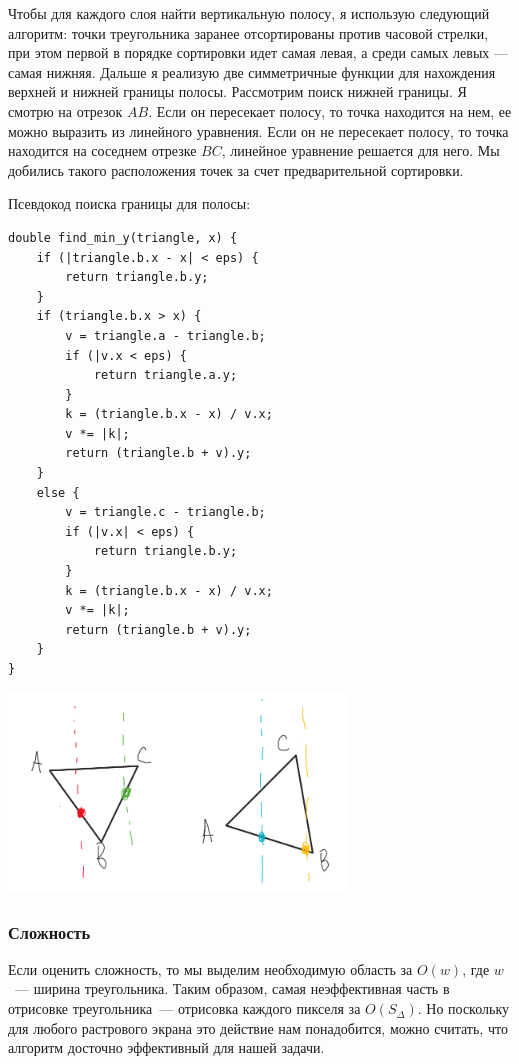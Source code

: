 \documentclass{article}
\begin{document}
Чтобы для каждого слоя найти вертикальную полосу, я использую следующий алгоритм: точки треугольника заранее отсортированы против часовой стрелки, при этом первой в порядке сортировки идет самая левая, а среди самых левых --- самая нижняя. Дальше я реализую две симметричные функции для нахождения верхней и нижней границы полосы. Рассмотрим поиск нижней границы. Я смотрю на отрезок $AB$. Если он пересекает полосу, то точка находится на нем, ее можно выразить из линейного уравнения. Если он не пересекает полосу, то точка находится на соседнем отрезке $BC$, линейное уравнение решается для него. Мы добились такого расположения точек за счет предварительной сортировки.

Псевдокод поиска границы для полосы:

\begin{verbatim}
double find_min_y(triangle, x) {
    if (|triangle.b.x - x| < eps) {
        return triangle.b.y;
    }
    if (triangle.b.x > x) {
        v = triangle.a - triangle.b;
        if (|v.x < eps) {
            return triangle.a.y;   
        }
        k = (triangle.b.x - x) / v.x;
        v *= |k|;
        return (triangle.b + v).y;
    }
    else {
        v = triangle.c - triangle.b;
        if (|v.x| < eps) {
            return triangle.b.y;
        }
        k = (triangle.b.x - x) / v.x;
        v *= |k|;
        return (triangle.b + v).y;
    }
}

\end{verbatim}

\begin{center}
\includegraphics[width=9cm]{sweepline.png}
\end{center}


\subsubsection{Сложность}

Если оценить сложность, то мы выделим необходимую область за $O(w)$, где $w$~--- ширина треугольника. Таким образом, самая неэффективная часть в отрисовке треугольника~--- отрисовка каждого пикселя за $O(S_{\Delta})$. Но поскольку для любого растрового экрана это действие нам понадобится, можно считать, что алгоритм досточно эффективный для нашей задачи.
\end{document}
